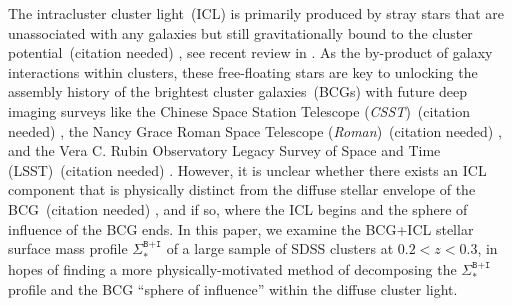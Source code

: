 \documentclass[fleqn,usenatbib]{mnras}
\newcommand{\sigbi}{\Sigma_*^{\texttt{B+I}}}
\newcommand\xkchen[1]{{\color{cyan} {#1}}}
\newcommand*\citeme{{\color{green}(citation needed)}}
\begin{document}
The intracluster cluster light~(ICL) is primarily produced by stray stars
that are unassociated with any galaxies but still gravitationally bound to
the cluster potential~\citeme \xkchen{\citep{Zwicky1937, Zwicky1952}, see recent review in \citep{Contini2021a} }. As the by-product of galaxy interactions
within clusters, these free-floating stars are key to unlocking the
assembly history of the brightest cluster galaxies~(BCGs) with future deep
imaging surveys like the Chinese Space Station Telescope ({\it CSST})~\citeme \xkchen{\citep{Gong2019} }, the Nancy Grace Roman Space Telescope ({\it Roman})~\citeme \xkchen{\citep{Spergel2015, Akeson2019} }, and the Vera C. Rubin Observatory Legacy Survey of Space and Time (LSST)~\citeme \xkchen{\citep{Ivezic2019} }. However, it is unclear whether there exists an ICL component
that is physically distinct from the diffuse stellar envelope of the
BCG~\citeme \xkchen{\citep{Kluge2021} }, and if so, where the ICL begins and the sphere of influence of
the BCG ends. In this paper, we examine the BCG+ICL stellar surface mass
profile $\sigbi$ of a large sample of SDSS clusters at $0.2{<}z{<}0.3$, in
hopes of finding a more physically-motivated method of decomposing the
$\sigbi$ profile and the BCG ``sphere of influence'' within the diffuse
cluster light.
\end{document}
